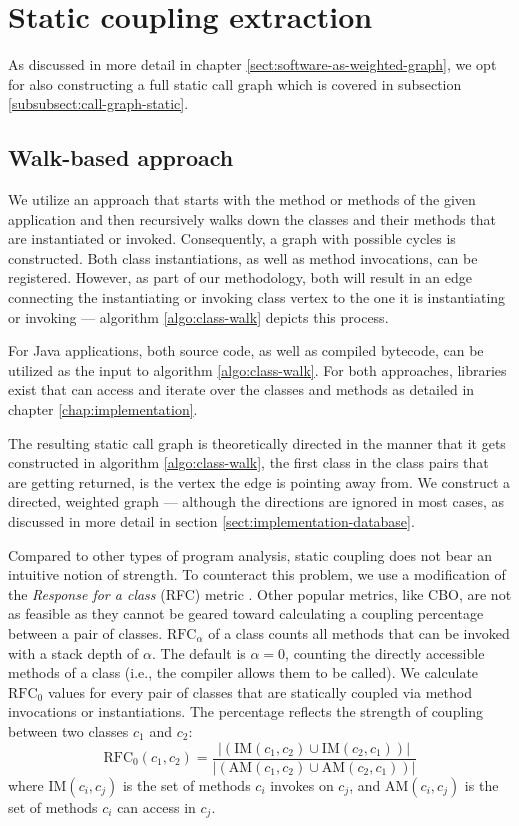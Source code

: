 \documentclass[12pt,a4paper]{report}
\begin{document}
\section{Static coupling extraction} \label{sect:static-coupling-extraction}

As discussed in more detail in chapter \ref{sect:software-as-weighted-graph},
we opt for also constructing a full static call graph which is covered in
subsection \ref{subsubsect:call-graph-static}.


\subsection{Walk\hyp based approach}

We utilize an approach that starts with the  method or methods of
the given application and then recursively walks down the classes and their
methods that are instantiated or invoked. Consequently, a graph with possible
cycles is constructed. Both class instantiations, as well as method
invocations, can be registered. However, as part of our methodology, both will
result in an edge connecting the instantiating or invoking class vertex to the
one it is instantiating or invoking --- algorithm \ref{algo:class-walk} depicts
this process.

For Java applications, both source code, as well as compiled bytecode, can be
utilized as the input to algorithm \ref{algo:class-walk}. For both approaches,
libraries exist that can access and iterate over the classes and methods as
detailed in chapter \ref{chap:implementation}.

The resulting static call graph is theoretically directed in the manner that it
gets constructed in algorithm \ref{algo:class-walk}, the first class in the
class pairs that are getting returned, is the vertex the edge is pointing away
from. We construct a directed, weighted graph ---
although the directions are ignored in most cases, as discussed in
more detail in section \ref{sect:implementation-database}.

Compared to other types of program analysis, static coupling does not bear an
intuitive notion of strength.
To counteract this problem, we use a modification of the
\textit{Response for a class} (RFC) metric \cite{briand1999unified}.
Other popular metrics, like CBO, are not as feasible
as they cannot be geared toward calculating a coupling percentage between
a pair of classes.
\(\text{RFC}_\alpha\) of a class counts all methods that can be invoked with
a stack depth of \(\alpha\). The default is \(\alpha = 0\),
counting the directly accessible methods of a class
(i.e., the compiler allows them to be called).
We calculate $\text{RFC}_0$ values for every pair of classes that are statically
coupled via method invocations or instantiations.
The percentage reflects the strength of coupling between two classes $c_1$ and $c_2$:
\[
  \text{RFC}_{0}(c_1, c_2) = \frac{\vert (\text{IM}(c_1, c_2) \cup \text{IM}(c_2, c_1)) \vert}{\vert (\text{AM}(c_1, c_2) \cup \text{AM}(c_2, c_1)) \vert}
\]
where \(\text{IM}(c_i, c_j)\) is the set of methods $c_i$ invokes on $c_j$,
and \(\text{AM}(c_i, c_j)\) is the set of methods $c_i$ can access in $c_j$.
\end{document}
